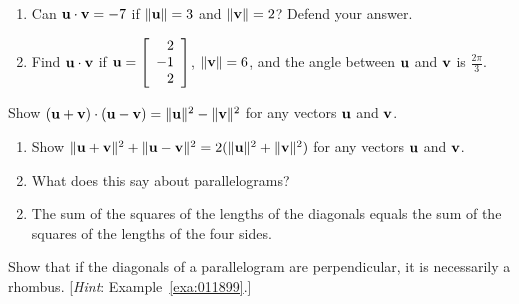 \begin{multicols}{2}
\begin{ex}
\begin{enumerate}[label={\alph*.}]
\item Can $\textbf{u} \cdot \textbf{v} = -7$ if $\|\textbf{u}\| = 3$ and $\|\textbf{v}\| = 2$? Defend your answer.

\item Find $\textbf{u} \cdot \textbf{v}$ if $\textbf{u} = \left[
\begin{array}{r}
2\\
-1\\
2
\end{array}
\right]$, $\| \textbf{v} \| = 6$, and the angle between $\textbf{u}$ and $\textbf{v}$ is $\frac{2\pi}{3}$.

\end{enumerate}
\end{ex}

\begin{ex}
Show $(\textbf{u} + \textbf{v}) \cdot (\textbf{u} - \textbf{v}) = \|\textbf{u}\|^{2} - \|\textbf{v}\|^{2}$ for any vectors $\textbf{u}$ and $\textbf{v}$.
\end{ex}

\begin{ex}
\begin{enumerate}[label={\alph*.}]
\item Show $\|\textbf{u} + \textbf{v}\|^{2} + \|\textbf{u} - \textbf{v}\|^{2} = 2(\|\textbf{u}\|^{2} + \|\textbf{v}\|^{2})$ for any vectors $\textbf{u}$ and $\textbf{v}$.

\item What does this say about parallelograms?

\end{enumerate}
\begin{sol}
\begin{enumerate}[label={\alph*.}]
\setcounter{enumi}{1}
\item  The sum of the squares of the lengths of the diagonals equals the sum of the squares of the lengths of the four sides.

\end{enumerate}
\end{sol}
\end{ex}

\begin{ex}
Show that if the diagonals of a parallelogram are perpendicular, it is necessarily a rhombus. [\textit{Hint}: Example~\ref{exa:011899}.]
\end{ex}


\end{multicols}

